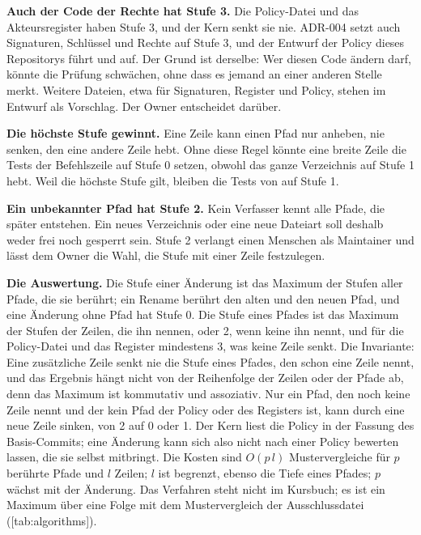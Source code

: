{\bf Auch der Code der Rechte hat Stufe 3.}
Die Policy-Datei und das Akteursregister haben Stufe 3, und der Kern senkt sie nie.
ADR-004 setzt auch Signaturen, Schlüssel und Rechte auf Stufe 3,
und der Entwurf der Policy dieses Repositorys führt  und  auf.
Der Grund ist derselbe:
Wer diesen Code ändern darf, könnte die Prüfung schwächen,
ohne dass es jemand an einer anderen Stelle merkt.
Weitere Dateien, etwa für Signaturen, Register und Policy, stehen im Entwurf als Vorschlag.
Der Owner entscheidet darüber.

{\bf Die höchste Stufe gewinnt.}
Eine Zeile kann einen Pfad nur anheben, nie senken, den eine andere Zeile hebt.
Ohne diese Regel könnte eine breite Zeile 
die Tests der Befehlszeile auf Stufe 0 setzen,
obwohl  das ganze Verzeichnis auf Stufe 1 hebt.
Weil die höchste Stufe gilt, bleiben die Tests von  auf Stufe 1.

{\bf Ein unbekannter Pfad hat Stufe 2.}
Kein Verfasser kennt alle Pfade, die später entstehen.
Ein neues Verzeichnis oder eine neue Dateiart soll deshalb weder frei noch gesperrt sein.
Stufe 2 verlangt einen Menschen als Maintainer und lässt dem Owner die Wahl,
die Stufe mit einer Zeile festzulegen.

{\bf Die Auswertung.}
Die Stufe einer Änderung ist das Maximum der Stufen aller Pfade, die sie berührt;
ein Rename berührt den alten und den neuen Pfad, und eine Änderung ohne Pfad hat Stufe 0.
Die Stufe eines Pfades ist das Maximum der Stufen der Zeilen, die ihn nennen, oder 2,
wenn keine ihn nennt,
und für die Policy-Datei und das Register mindestens 3, was keine Zeile senkt.
Die Invariante: Eine zusätzliche Zeile senkt nie die Stufe eines Pfades, den schon eine Zeile
nennt, und das Ergebnis hängt nicht von der Reihenfolge der Zeilen oder der Pfade ab,
denn das Maximum ist kommutativ und assoziativ.
Nur ein Pfad, den noch keine Zeile nennt und der kein Pfad der Policy oder des Registers ist,
kann durch eine neue Zeile sinken, von 2 auf 0 oder 1.
Der Kern liest die Policy in der Fassung des Basis-Commits;
eine Änderung kann sich also nicht nach einer Policy bewerten lassen, die sie selbst mitbringt.
Die Kosten sind $O(p\,l)$ Mustervergleiche für $p$ berührte Pfade und $l$ Zeilen;
$l$ ist begrenzt, ebenso die Tiefe eines Pfades; $p$ wächst mit der Änderung.
Das Verfahren steht nicht im Kursbuch; es ist ein Maximum über eine Folge mit dem Mustervergleich
der Ausschlussdatei ([tab:algorithms]).

